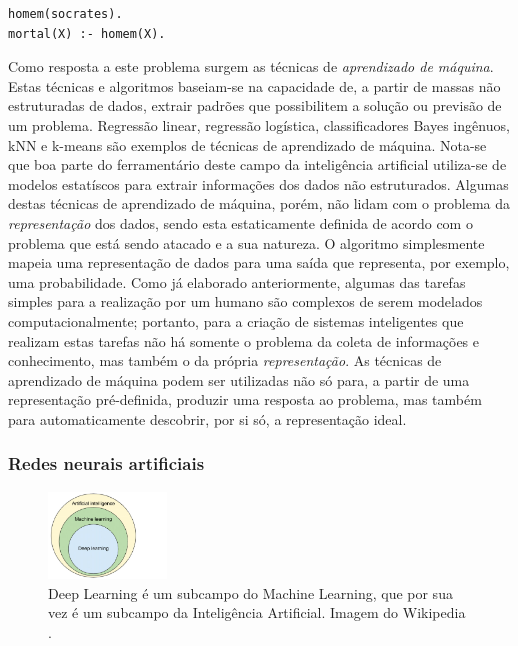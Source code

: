 \documentclass[12pt, a4paper]{article}
\begin{document}
\bigskip
\begin{lstlisting}[caption={Exemplo do uso da linguagem Prolog para modelar a famosa proposição da mortalidade de Sócrates.}, captionpos=b]
homem(socrates).
mortal(X) :- homem(X).
\end{lstlisting}

Como resposta a este problema surgem as técnicas de \emph{aprendizado de máquina}. Estas técnicas e algoritmos
baseiam-se na capacidade de, a partir de massas não estruturadas de dados, extrair padrões que
possibilitem a solução ou previsão de um problema.
Regressão linear, regressão logística, classificadores Bayes ingênuos, 
kNN e k-means são exemplos de técnicas de aprendizado de máquina.
Nota-se que boa parte do ferramentário deste campo da inteligência artificial utiliza-se de modelos estatíscos para extrair informações
dos dados não estruturados. Algumas destas técnicas de aprendizado de máquina, porém, não lidam com o problema da \emph{representação}
dos dados, sendo esta estaticamente definida de acordo com o problema que está sendo atacado e a sua natureza. O algoritmo simplesmente mapeia uma representação de dados para uma saída que representa, por exemplo, uma probabilidade.
Como já elaborado anteriormente, algumas das tarefas simples para a realização por um humano são complexos de serem modelados computacionalmente;
portanto, para a criação de sistemas inteligentes que realizam estas tarefas não há somente o problema da coleta de informações e conhecimento,
mas também o da própria \emph{representação}. 
As técnicas de aprendizado de máquina podem ser utilizadas não só para, a partir de uma representação pré-definida, produzir uma resposta ao problema, mas também para automaticamente descobrir, por si só, a representação ideal.

\subsubsection{Redes neurais artificiais}

\begin{figure}
	\begin{center}
		\includegraphics[width=0.28\textwidth]{fig/ml_venn}
	\end{center}
	\caption{
		Deep Learning é um subcampo do Machine Learning, que por sua vez é um subcampo da Inteligência Artificial.
		Imagem do Wikipedia
		\cite{wikipedia_ml}.
	}
\end{figure}
\end{document}
